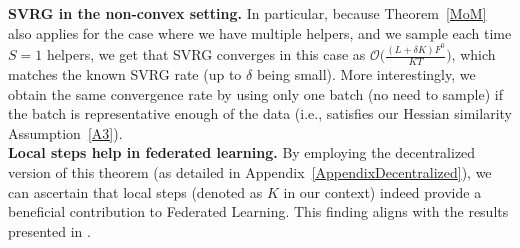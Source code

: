 \documentclass[10pt]{article} %
\newcommand{\comment}[1]{}
\theoremstyle{plain}
\theoremstyle{definition}
\theoremstyle{remark}
\begin{document}
\textbf{SVRG in the non-convex setting.} In particular, because Theorem~\ref{MoM} also applies for the case where we have multiple helpers, and we sample each time $S=1$ helpers, we get that SVRG converges in this case as $\mathcal{O}\big(\frac{(L + \delta K)F^0}{KT}\big)$, which matches the known SVRG rate \citep{SVRGnonC} (up to $\delta$ being small). More interestingly, we obtain the same convergence rate by using only one batch (no need to sample) if the batch is representative enough of the data (i.e., satisfies our Hessian similarity Assumption~\ref{A3}).\\
\textbf{Local steps help in federated learning.} By employing the decentralized version of this theorem (as detailed in Appendix~\ref{AppendixDecentralized}), we can ascertain that local steps (denoted as $K$ in our context) indeed provide a beneficial contribution to Federated Learning. This finding aligns with the results presented in \citep{MiMe}.

\comment{\textbf{Remark.} In federated learning, when we sample $S$ agents (this case is included in the appendix) the variance $\sigma_f^2$ should be modified to include an additional term due to sampling, the new variance should be $\frac{\sigma^2}{S} + \frac{N-S}{NS}H^\star$  for a constant $H^\star$ that quantifies the variance due to agent sampling and $\sigma^2$ the variance of local gradients.}
\end{document}
